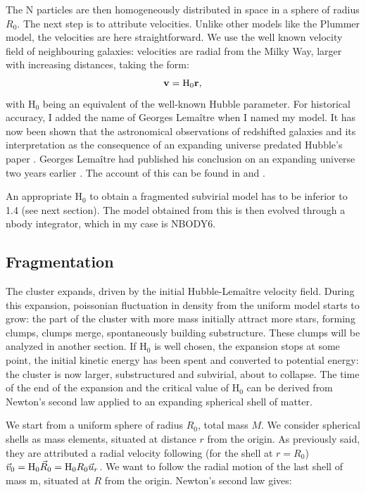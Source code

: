 The N particles are then homogeneously distributed in space in a sphere of radius $R_0$. The next step is to attribute velocities. Unlike other models like the Plummer model, the velocities are here straightforward. We use the well known velocity field of neighbouring galaxies: velocities are radial from the Milky Way, larger with increasing distances, taking the form:
\begin{equation}
\bold{v} =  \textrm{H}_0 \bold{r},
\end{equation}
with H$_0$ being an equivalent of the well-known Hubble parameter. For historical accuracy, I added the name of Georges Lema\^itre when I named my model. It has now been shown that the astronomical observations of redshifted galaxies and its interpretation as the consequence of an expanding universe predated Hubble's paper \citep{Hubble1929}. Georges Lema\^itre had published his conclusion on an expanding universe two years earlier \citep{Lemaitre1927}. The account of this can be found in \cite{Kragh2003,VanDenBergh2011} and \cite{Freeman2015}.

An appropriate H$_0$ to obtain a fragmented subvirial model has to be inferior to 1.4 (see next section). The model obtained from this is then evolved through a nbody integrator, which in my case is NBODY6.


\subsection{Fragmentation}

The cluster expands, driven by the initial Hubble-Lema\^itre velocity field. During this expansion, poissonian fluctuation in density from the uniform model starts to grow: the part of the cluster with more mass initially attract more stars, forming clumps, clumps merge, spontaneously building substructure. These clumps will be analyzed in another section. If H$_0$ is well chosen, the expansion stops at some point, the initial kinetic energy has been spent and converted to potential energy: the cluster is now larger, substructured and subvirial, about to collapse. The time of the end of the expansion and the critical value of H$_0$ can be derived from Newton's second law applied to an expanding spherical shell of matter.

We start from a uniform sphere of radius $R_0$, total mass $M$. We consider spherical shells as mass elements, situated at distance $r$ from the origin. As previously said, they are attributed a radial velocity following (for the shell at $r=R_0$) $\vec v_0 = {\textrm{H}}_0 \vec R_0 = {\textrm{H}}_0 R_0 \vec u_r$. We want to follow the radial motion of the last shell of mass m, situated at $R$ from the origin. Newton's second law gives:


